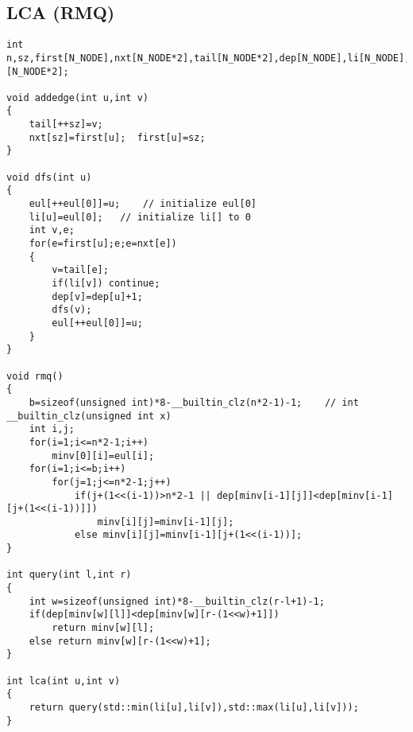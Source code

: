 \documentclass[a4paper,12pt]{article}
\begin{document}
\subsection{LCA (RMQ)}
\begin{lstlisting}
int n,sz,first[N_NODE],nxt[N_NODE*2],tail[N_NODE*2],dep[N_NODE],li[N_NODE],eul[N_NODE*2],b,minv[LOG_N_NODE][N_NODE*2];

void addedge(int u,int v)
{
    tail[++sz]=v;
    nxt[sz]=first[u];  first[u]=sz;
}

void dfs(int u)
{
    eul[++eul[0]]=u;    // initialize eul[0]
    li[u]=eul[0];   // initialize li[] to 0
    int v,e;
    for(e=first[u];e;e=nxt[e])
    {
        v=tail[e];
        if(li[v]) continue;
        dep[v]=dep[u]+1;
        dfs(v);
        eul[++eul[0]]=u;
    }
}

void rmq()
{
    b=sizeof(unsigned int)*8-__builtin_clz(n*2-1)-1;    // int __builtin_clz(unsigned int x)
    int i,j;
    for(i=1;i<=n*2-1;i++)
        minv[0][i]=eul[i];
    for(i=1;i<=b;i++)
        for(j=1;j<=n*2-1;j++)
            if(j+(1<<(i-1))>n*2-1 || dep[minv[i-1][j]]<dep[minv[i-1][j+(1<<(i-1))]])
                minv[i][j]=minv[i-1][j];
            else minv[i][j]=minv[i-1][j+(1<<(i-1))];
}

int query(int l,int r)
{
    int w=sizeof(unsigned int)*8-__builtin_clz(r-l+1)-1;
    if(dep[minv[w][l]]<dep[minv[w][r-(1<<w)+1]])
        return minv[w][l];
    else return minv[w][r-(1<<w)+1];
}

int lca(int u,int v)
{
    return query(std::min(li[u],li[v]),std::max(li[u],li[v]));
}
\end{lstlisting}
\end{document}
